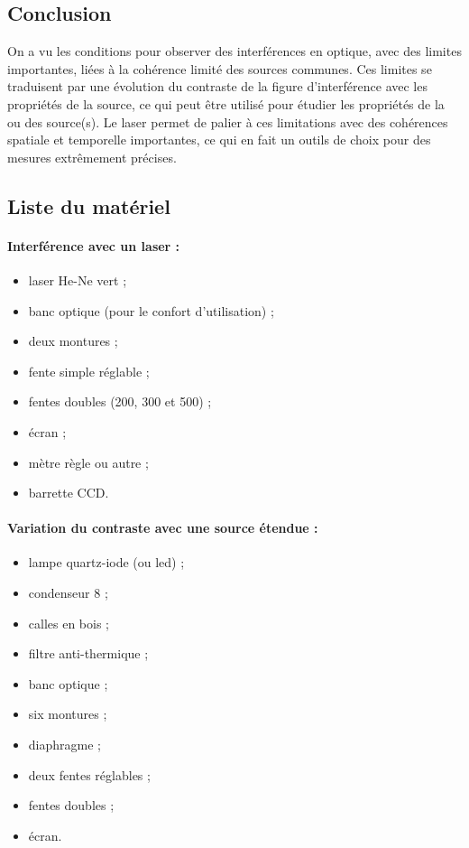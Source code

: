 \subsection*{Conclusion}

On a vu les conditions pour observer des interférences en optique, avec des limites importantes, liées à la cohérence limité des sources communes.
Ces limites se traduisent par une évolution du contraste de la figure d'interférence avec les propriétés de la source, ce qui peut être utilisé pour étudier les propriétés de la ou des source(s).
Le laser permet de palier à ces limitations avec des cohérences spatiale et temporelle importantes, ce qui en fait un outils de choix pour des mesures extrêmement précises.

\subsection*{Liste du matériel}

\paragraph{Interférence avec un laser :}
\begin{itemize}
\item laser He-Ne vert ;
\item banc optique (pour le confort d'utilisation) ;
\item deux montures ;
\item fente simple réglable ;
\item fentes doubles (200, 300 et \unit{500}{\micro\meter}) ;
\item écran ;
\item mètre règle ou autre ;
\item barrette CCD.
\end{itemize}

\paragraph{Variation du contraste avec une source étendue :}
\begin{itemize}
\item lampe quartz-iode (ou led) ;
\item condenseur \unit{8}{\centi\meter} ;
\item calles en bois ;
\item filtre anti-thermique ;
\item banc optique ;
\item six montures ;
\item diaphragme ;
\item deux fentes réglables ;
\item fentes doubles ;
\item écran.
\end{itemize}

\newpage